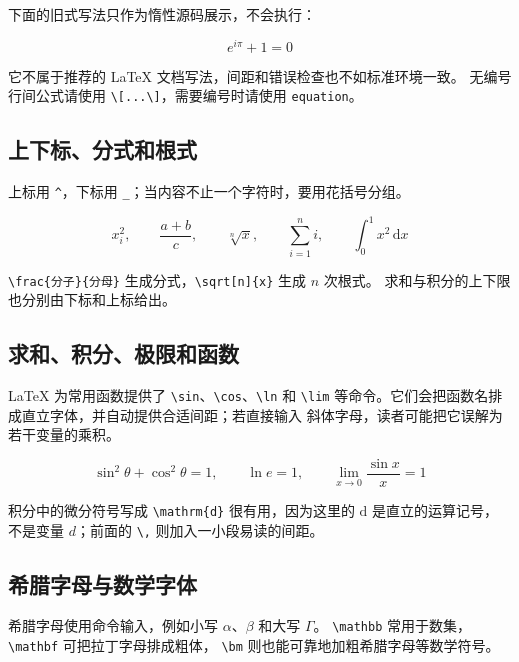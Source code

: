 \begin{errorbox}
下面的旧式写法只作为惰性源码展示，不会执行：
\begin{codeblock}
$$
    e^{i\pi}+1=0
$$
\end{codeblock}
它不属于推荐的 LaTeX 文档写法，间距和错误检查也不如标准环境一致。
无编号行间公式请使用 \verb|\[...\]|，需要编号时请使用 \texttt{equation}。
\end{errorbox}

\subsection{上下标、分式和根式}

上标用 \verb|^|，下标用 \verb|_|；当内容不止一个字符时，要用花括号分组。

\[
    x_i^2,\qquad
    \frac{a+b}{c},\qquad
    \sqrt[n]{x},\qquad
    \sum_{i=1}^{n} i,\qquad
    \int_0^1 x^2\,\mathrm{d}x
\]

\verb|\frac{分子}{分母}| 生成分式，\verb|\sqrt[n]{x}| 生成 $n$ 次根式。
求和与积分的上下限也分别由下标和上标给出。

\subsection{求和、积分、极限和函数}

LaTeX 为常用函数提供了 \verb|\sin|、\verb|\cos|、\verb|\ln| 和
\verb|\lim| 等命令。它们会把函数名排成直立字体，并自动提供合适间距；若直接输入
斜体字母，读者可能把它误解为若干变量的乘积。

\[
    \sin^2\theta+\cos^2\theta=1,\qquad
    \ln e=1,\qquad
    \lim_{x\to 0}\frac{\sin x}{x}=1
\]

积分中的微分符号写成 \verb|\mathrm{d}| 很有用，因为这里的 $\mathrm{d}$
是直立的运算记号，不是变量 $d$；前面的 \verb|\,| 则加入一小段易读的间距。

\subsection{希腊字母与数学字体}

希腊字母使用命令输入，例如小写 $\alpha$、$\beta$ 和大写 $\Gamma$。
\verb|\mathbb| 常用于数集，\verb|\mathbf| 可把拉丁字母排成粗体，
\verb|\bm| 则也能可靠地加粗希腊字母等数学符号。

